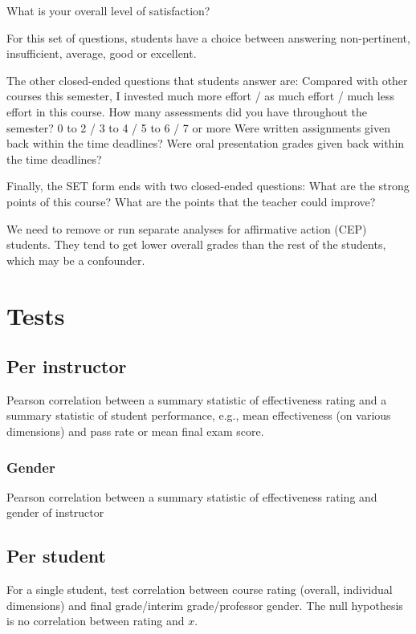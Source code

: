 \documentclass[12pt]{article}
\newcommand{\todo}[1]{{\color{red}{TO DO: \sc #1}}}
\begin{document}
What is your overall level of satisfaction?

For this set of questions, students have a choice between answering non-pertinent, insufficient, average, good or excellent.

The other closed-ended questions that students answer are:
Compared with other courses this semester, I invested much more effort / as much effort / much less effort in this course. 
How many assessments did you have throughout the semester? 
0 to 2 / 3 to 4 / 5 to 6 / 7 or more
Were written assignments given back within the time deadlines?
Were oral presentation grades given back within the time deadlines? 

Finally, the SET form ends with two closed-ended questions: 
What are the strong points of this course? 
What are the points that the teacher could improve?      


We need to remove or run separate analyses for affirmative action (CEP) students. They tend to get lower overall 
grades than the rest of the students, which may be a confounder.

\section{Tests}

\subsection{Per instructor}
Pearson correlation between a summary statistic of effectiveness rating and a summary statistic
of student performance, e.g., mean effectiveness (on various dimensions) and pass rate or mean
final exam score.
\todo{code is ready.  Do we do all metrics?}

\subsubsection{Gender}
Pearson correlation between a summary statistic of effectiveness rating and gender of instructor
\todo{code is ready.  Do we do all metrics?}

\subsection{Per student}
For a single student, test correlation between course rating (overall, individual dimensions) and final grade/interim grade/professor gender.
The null hypothesis is no correlation between rating and $x$.
\end{document}
